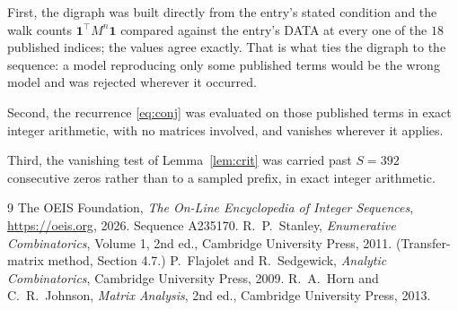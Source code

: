 \documentclass[11pt,a4paper]{article}
\theoremstyle{plain}
\theoremstyle{definition}
\begin{document}
First, the digraph was built directly from the entry's stated condition and the walk counts
$\mathbf{1}^{\!\top}M^{n}\mathbf{1}$ compared against the entry's DATA at every one of
the $18$ published indices; the values agree exactly. That is what ties the digraph to
the sequence: a model reproducing only some published terms would be the wrong model and
was rejected wherever it occurred.

Second, the recurrence \eqref{eq:conj} was evaluated on those published terms in exact
integer arithmetic, with no matrices involved, and vanishes wherever it applies.

Third, the vanishing test of Lemma~\ref{lem:crit} was carried past $S=392$ consecutive
zeros rather than to a sampled prefix, in exact integer arithmetic.

\begin{thebibliography}{9}
 The OEIS Foundation, \emph{The On-Line Encyclopedia of Integer
Sequences}, \url{https://oeis.org}, 2026. Sequence A235170.
 R.~P.~Stanley, \emph{Enumerative Combinatorics}, Volume 1, 2nd ed.,
Cambridge University Press, 2011. (Transfer-matrix method, Section 4.7.)
 P.~Flajolet and R.~Sedgewick, \emph{Analytic Combinatorics}, Cambridge
University Press, 2009.
 R.~A.~Horn and C.~R.~Johnson, \emph{Matrix Analysis}, 2nd ed., Cambridge
University Press, 2013.
\end{thebibliography}
\end{document}
